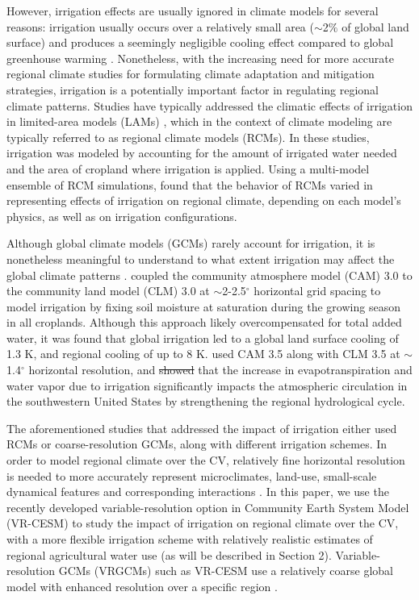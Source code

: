 \documentclass[draft,ms]{agutex}   %
\providecommand{\DIFadd}[1]{{\protect\color{blue}\uwave{#1}}} %
\providecommand{\DIFdel}[1]{{\protect\color{red}\sout{#1}}}                      %
\providecommand{\DIFaddbegin}{} %
\providecommand{\DIFaddend}{} %
\providecommand{\DIFdelbegin}{} %
\providecommand{\DIFdelend}{} %
\begin{document}
\begin{article}
However, irrigation effects are usually ignored in climate models for several reasons: irrigation usually occurs over a relatively small area ($\sim$2$\%$ of global land surface) and produces a seemingly negligible cooling effect compared to global greenhouse warming \citep{boucher2004direct}. Nonetheless, with the increasing need for more accurate regional climate studies for formulating climate adaptation and mitigation strategies, irrigation is a potentially important factor in regulating regional climate patterns. Studies have typically addressed the climatic effects of irrigation in limited-area models (LAMs) \citep{snyder2006regional, kueppers2007irrigation}, which in the context of climate modeling are typically referred to as regional climate models (RCMs). In these studies, irrigation was modeled by accounting for the amount of irrigated water needed and the area of cropland where irrigation is applied. Using a multi-model ensemble of RCM simulations, \cite{kueppers2008seasonal} found that the behavior of RCMs varied in representing effects of irrigation on regional climate, depending on each model's physics, as well as on irrigation configurations.

Although global climate models (GCMs) rarely account for irrigation, it is nonetheless meaningful to understand to what extent irrigation may affect the global climate patterns \citep{sacks2009effects}. \citet{lobell2006biogeophysical} coupled the community atmosphere model (CAM) 3.0 to the community land model (CLM) 3.0 at $\sim$2-2.5$^\circ$ horizontal grid spacing to model irrigation by fixing soil moisture at saturation during the growing season in all croplands. Although this approach likely overcompensated for total added water, it was found that global irrigation led to a global land surface cooling of 1.3 K, and regional cooling of up to 8 K. \citet{lo2013irrigation} used CAM 3.5 along with CLM 3.5 at $\sim$1.4$^\circ$ horizontal resolution, and \DIFdelbegin \DIFdel{showed }\DIFdelend \DIFaddbegin \DIFadd{argued }\DIFaddend that the increase in evapotranspiration and water vapor due to irrigation significantly impacts the atmospheric circulation in the southwestern United States by strengthening the regional hydrological cycle.

The aforementioned studies that addressed the impact of irrigation either used RCMs or coarse-resolution GCMs, along with different irrigation schemes. In order to model regional climate over the CV, relatively fine horizontal resolution is needed to more accurately represent microclimates, land-use, small-scale dynamical features and corresponding interactions \citep{leung2003regional, rauscher2010resolution}. In this paper, we use the recently developed variable-resolution option in Community Earth System Model (VR-CESM) to study the impact of irrigation on regional climate over the CV, with a more flexible irrigation scheme with relatively realistic estimates of regional agricultural water use (as will be described in Section 2). Variable-resolution GCMs (VRGCMs) such as VR-CESM use a relatively coarse global model with enhanced resolution over a specific region \citep{staniforth1978variable, fox1997finite}. 



\end{article}
\end{document}
